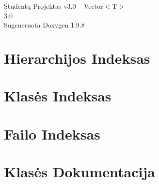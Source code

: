 \documentclass[twoside]{book}
\newcommand{\+}{\discretionary{\mbox{\scriptsize$\hookleftarrow$}}{}{}}
\newcommand{\clearemptydoublepage}{%
    \newpage{\pagestyle{empty}\cleardoublepage}%
  }
\begin{document}
  \raggedbottom
    \hypersetup{pageanchor=false,
                bookmarksnumbered=true,
                pdfencoding=unicode
               }
  \begin{titlepage}
  \vspace*{7cm}
  \begin{center}%
  {\Large Studentų Projektas v3.\+0 – Vector$<$\+T$>$}\\
  [1ex]\large 3.\+0 \\
  \vspace*{1cm}
  {\large Sugeneruota Doxygen 1.9.8}\\
  \end{center}
  \end{titlepage}
  \clearemptydoublepage
  \tableofcontents
  \clearemptydoublepage
  \hypersetup{pageanchor=true}
\chapter{Hierarchijos Indeksas}

\chapter{Klasės Indeksas}

\chapter{Failo Indeksas}

\chapter{Klasės Dokumentacija}








\end{document}
